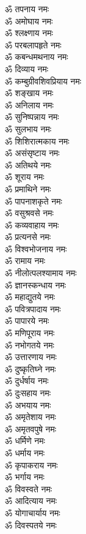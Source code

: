 \begin{multicols}{2}
\begin{flushleft}
ॐ तपनाय नमः\\
ॐ अमोघाय नमः\\
ॐ श्लक्ष्णाय नमः\\
ॐ परबलापहृते नमः\\
ॐ कबन्धमथनाय नमः\hfill{}\\
ॐ दिव्याय नमः\\
ॐ कम्बुग्रीवशिवप्रियाय नमः\\
ॐ शङ्खाय नमः\\
ॐ अनिलाय नमः\\
ॐ सुनिष्पन्नाय नमः\\
ॐ सुलभाय नमः\\
ॐ शिशिरात्मकाय नमः\\
ॐ असंसृष्टाय नमः\\
ॐ अतिथये नमः\\
ॐ शूराय नमः\hfill{}\\
ॐ प्रमाथिने नमः\\
ॐ पापनाशकृते नमः\\
ॐ वसुश्रवसे नमः\\
ॐ कव्यवाहाय नमः\\
ॐ प्रत्यनसे नमः\\
ॐ विश्वभोजनाय नमः\\
ॐ रामाय नमः\\
ॐ नीलोत्पलश्यामाय नमः\\
ॐ ज्ञानस्कन्धाय नमः\\
ॐ महाद्युतये नमः\hfill{}\\
ॐ पवित्रपादाय नमः\\
ॐ पापारये नमः\\
ॐ मणिपूराय नमः\\
ॐ नभोगतये नमः\\
ॐ उत्तारणाय नमः\\
ॐ दुष्कृतिघ्ने नमः\\
ॐ दुर्धर्षाय नमः\\
ॐ दुःसहाय नमः\\
ॐ अभयाय नमः\\
ॐ अमृतेशाय नमः\hfill{}\\
ॐ अमृतवपुषे नमः\\
ॐ धर्मिणे नमः\\
ॐ धर्माय नमः\\
ॐ कृपाकराय नमः\\
ॐ भर्गाय नमः\\
ॐ विवस्वते नमः\\
ॐ आदित्याय नमः\\
ॐ योगाचार्याय नमः\\
ॐ दिवस्पतये नमः\\

\end{flushleft}
\end{multicols}
